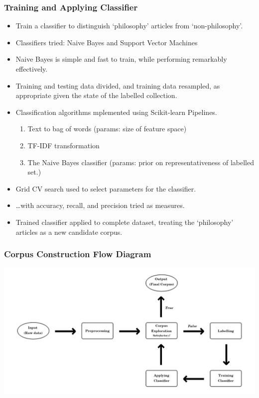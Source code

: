 \documentclass[10pt, compress]{beamer}
\begin{document}
\begin{frame}
	\frametitle{Training and Applying Classifier}

	\pause

  \begin{itemize}[<+- | alert@+>]
		\item Train a classifier to distinguish `philosophy' articles from `non-philosophy'.
		\item Classifiers tried: Naive Bayes and Support Vector Machines
		\item Naive Bayes is simple and fast to train, while performing remarkably effectively.
		\item Training and testing data divided, and training data resampled, as appropriate given the state of the labelled collection.
		\item Classification algorithms mplemented using Scikit-learn Pipelines.
		\begin{enumerate}
			\item Text to bag of words (params: size of feature space)
			\item TF-IDF transformation
			\item The Naive Bayes classifier (params: prior on representativeness of labelled set.)
		\end{enumerate}
		\item Grid CV search used to select parameters for the classifier.
		\item \ldots with accuracy, recall, and precision tried as measures.
		\item Trained classifier applied to complete dataset, treating the `philosophy' articles as a new candidate corpus.
	\end{itemize}

\end{frame}

\begin{frame}
	\frametitle{Corpus Construction Flow Diagram}
	\begin{center}
	\includegraphics[width=\textwidth]{images/flow_diagram.png}
	\end{center}
\end{frame}
\end{document}
